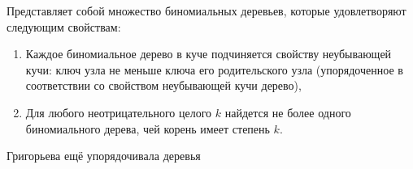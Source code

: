 \documentclass[discrete.tex]{subfiles}
\begin{document}
  \begin{definition}
    Представляет собой множество биномиальных деревьев, которые удовлетворяют следующим свойствам:
    \begin{enumerate}
      \item Каждое биномиальное дерево в куче подчиняется свойству неубывающей кучи: ключ узла не меньше ключа его родительского узла (упорядоченное в соответствии со свойством неубывающей кучи дерево),
      \item Для любого неотрицательного целого $k$ найдется не более одного биномиального дерева, чей корень имеет степень $k$.
    \end{enumerate}
  \end{definition}

  \begin{remark}
    Григорьева ещё упорядочивала деревья
  \end{remark}
\end{document}
